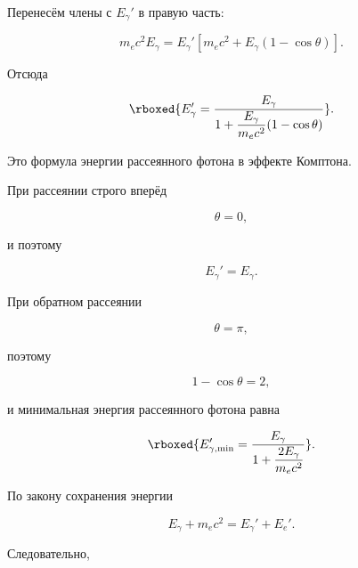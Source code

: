 \documentclass[../final.tex]{subfiles}
\begin{document}
Перенесём члены с $E_\gamma'$ в правую часть:

\begin{equation*}
    m_ec^2E_\gamma
    =
    E_\gamma'
    \left[
        m_ec^2
        +
        E_\gamma
        (1-\cos\theta)
    \right].
\end{equation*}

Отсюда

\begin{equation*}
    \rboxed{
        E_\gamma'
        =
        \frac{
            E_\gamma
        }{
            1+
            \dfrac{
                E_\gamma
            }{
                m_ec^2
            }
            (1-\cos\theta)
        }
    }.
\end{equation*}

Это формула энергии рассеянного фотона
в эффекте Комптона.

При рассеянии строго вперёд

\begin{equation*}
    \theta=0,
\end{equation*}

и поэтому

\begin{equation*}
    E_\gamma'
    =
    E_\gamma.
\end{equation*}

При обратном рассеянии

\begin{equation*}
    \theta=\pi,
\end{equation*}

поэтому

\begin{equation*}
    1-\cos\theta=2,
\end{equation*}

и минимальная энергия рассеянного фотона равна

\begin{equation*}
    \rboxed{
        E_{\gamma,\min}'
        =
        \frac{
            E_\gamma
        }{
            1+
            \dfrac{
                2E_\gamma
            }{
                m_ec^2
            }
        }
    }.
\end{equation*}

По закону сохранения энергии

\begin{equation*}
    E_\gamma+m_ec^2
    =
    E_\gamma'+E_e'.
\end{equation*}

Следовательно,
\end{document}
